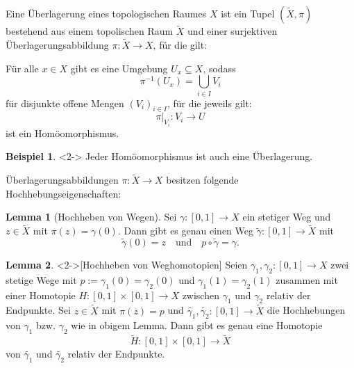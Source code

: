 \documentclass{beamer}
\newcommand{\R}{\mathbb{R}} %
\newcommand{\I}{\left[0,1\right]} %
\renewcommand{\emph}[1]{\textcolor{Emph}{#1}}
\theoremstyle{definition}
\newtheorem*{bsp}{Beispiel}
\newtheorem*{lem}{Lemma}
\begin{document}
\begin{frame}
  \begin{definition}
    
    Eine \emph{Überlagerung} eines topologischen Raumes $X$ ist ein Tupel $(\tilde{X}, \pi)$ bestehend aus einem topolischen Raum $\tilde{X}$ und einer surjektiven Überlagerungsabbildung $\pi : \tilde{X} \to X$, für die gilt:

    Für alle $x \in X$ gibt es eine Umgebung $U_x \subseteq X$, sodass
    \[ \pi^{-1}(U_x) = \bigcup_{i \in I} V_i \]
    für disjunkte offene Mengen $(V_i)_{i \in I}$, für die jeweils gilt:
    \[ \pi|_{V_i} : V_i \to U \]
    ist ein Homöomorphismus.
  \end{definition}

  \begin{bsp}<2->
    Jeder Homöomorphismus ist auch eine Überlagerung.
  \end{bsp}
\end{frame}


\begin{frame}
  Überlagerungsabbildungen $\pi : \tilde{X} \to X$ besitzen folgende Hochhebungseigenschaften:

  \begin{lem}[Hochheben von Wegen]
    Sei $\gamma : \I \to X$ ein stetiger Weg und $z \in \tilde{X}$ mit $\pi(z) = \gamma(0)$.
    Dann gibt es genau einen Weg $\tilde{\gamma} : \I \to \tilde{X}$ mit
    \[
      \tilde{\gamma}(0) = z
      \quad \text{und} \quad
      p \circ \tilde{\gamma} = \gamma.
    \]
  \end{lem}

  \begin{lem}<2->[Hochheben von Weghomotopien]
    Seien $\gamma_1, \gamma_2 : \I \to X$ zwei stetige Wege mit $p := \gamma_1(0) = \gamma_2(0)$ und $\gamma_1(1) = \gamma_2(1)$ zusammen mit einer Homotopie $H : \I \times \I \to X$ zwischen $\gamma_1$ und $\gamma_2$ relativ der Endpunkte. Sei $z \in \tilde{X}$ mit $\pi(z) = p$ und $\tilde{\gamma_1}, \tilde{\gamma_2} : \I \to \tilde{X}$ die Hochhebungen von $\gamma_1$ bzw. $\gamma_2$ wie in obigem Lemma. Dann gibt es genau eine Homotopie
    \[ \tilde{H} : \I \times \I \to \tilde{X} \]
    von $\tilde{\gamma_1}$ und $\tilde{\gamma_2}$ relativ der Endpunkte.
  \end{lem}
\end{frame}
\end{document}
